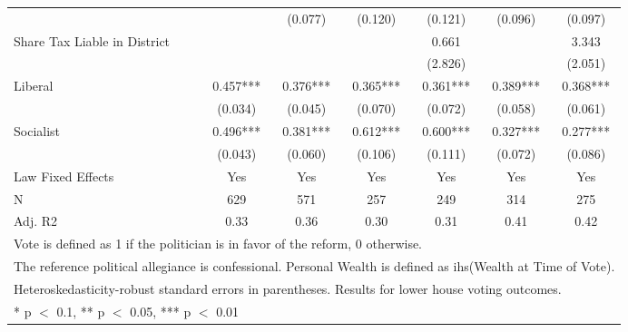 \begin{table}
\begin{tabular}[t]{lcccccc}
 &  & (\num{0.077}) & (\num{0.120}) & (\num{0.121}) & (\num{0.096}) & (\num{0.097})\\
Share Tax Liable in District &  &  &  & \num{0.661} &  & \num{3.343}\\
 &  &  &  & (\num{2.826}) &  & (\num{2.051})\\
Liberal & \num{0.457}*** & \num{0.376}*** & \num{0.365}*** & \num{0.361}*** & \num{0.389}*** & \num{0.368}***\\
 & (\num{0.034}) & (\num{0.045}) & (\num{0.070}) & (\num{0.072}) & (\num{0.058}) & (\num{0.061})\\
Socialist & \num{0.496}*** & \num{0.381}*** & \num{0.612}*** & \num{0.600}*** & \num{0.327}*** & \num{0.277}***\\
 & (\num{0.043}) & (\num{0.060}) & (\num{0.106}) & (\num{0.111}) & (\num{0.072}) & (\num{0.086})\\
\midrule
Law Fixed Effects & Yes & Yes & Yes & Yes & Yes & Yes\\
N & \num{629} & \num{571} & \num{257} & \num{249} & \num{314} & \num{275}\\
Adj. R2 & \num{0.33} & \num{0.36} & \num{0.30} & \num{0.31} & \num{0.41} & \num{0.42}\\
\bottomrule
\multicolumn{7}{l}{\rule{0pt}{1em}Vote is defined as 1 if the politician is in favor of the reform, 0 otherwise.}\\
\multicolumn{7}{l}{\rule{0pt}{1em}The reference political allegiance is confessional. Personal Wealth is defined as ihs(Wealth at Time of Vote).}\\
\multicolumn{7}{l}{\rule{0pt}{1em}Heteroskedasticity-robust standard errors in parentheses. Results for lower house voting outcomes.}\\
\multicolumn{7}{l}{\rule{0pt}{1em}* p $<$ 0.1, ** p $<$ 0.05, *** p $<$ 0.01}\\
\end{tabular}
\end{table}
